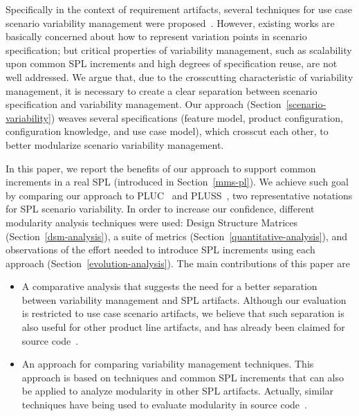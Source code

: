 \documentclass{acm_proc_article-sp}
\begin{document}
Specifically in the context of requirement artifacts, several techniques for use case scenario variability management were proposed~\cite{favaro-icsr-98,bertolino-esec-2003,fantechi-splc-2004,eriksson-splc-2005}. However, existing works are basically concerned about how to represent variation points in scenario specification; but critical properties of variability management, such as scalability upon common SPL increments and high degrees of specification reuse, are not well addressed. We argue that, due to the crosscutting characteristic of variability management, it is necessary to create a clear separation between scenario specification and variability management. Our approach (Section~\ref{scenario-variability}) weaves several specifications (feature model, product configuration, configuration knowledge, and use case model), which crosscut each other, to better modularize scenario variability management. 

In this paper, we report the benefits of our approach to support common increments in a real SPL (introduced in Section~\ref{mms-pl}). We achieve such goal by comparing our approach to PLUC~\cite{bertolino-esec-2003} and PLUSS~\cite{eriksson-splc-2005}, two representative notations for SPL scenario variability. In order to increase our confidence, different modularity analysis techniques were used: Design Structure Matrices (Section~\ref{dsm-analysis}), a suite of metrics (Section~\ref{quantitative-analysis}), and observations of the effort needed to introduce SPL increments using each approach (Section~\ref{evolution-analysis}). The main contributions of this paper are

\begin{itemize}
\item A comparative analysis that suggests the need for a better separation between variability management and SPL artifacts. Although our evaluation is restricted to use case scenario artifacts, we believe that such separation is also useful for other product line artifacts, and has already been claimed for source code~\cite{alves-gpce-06,mmedeiros-lawasp-2007}.

\item An approach for comparing variability management techniques. This approach is based on techniques and common SPL increments that can also be applied to analyze modularity in other SPL artifacts. Actually, similar techniques have being used to evaluate modularity in source code~\cite{vlopes-aosd-2005, sullivan-fse-2005,garcia-taosd-2005, greenwood-ecoop-2007}.   

\end{itemize}
\end{document}
